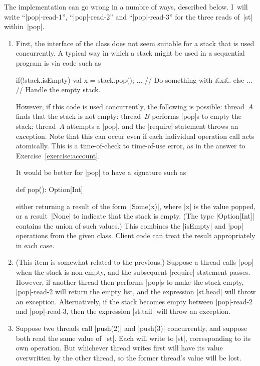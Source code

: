 \begin{answerS}
The implementation can go wrong in a numbre of ways, described below.  I~will
write ``|pop|-read-1'', ``|pop|-read-2'' and ``|pop|-read-3'' for the three
reads of~|st| within~|pop|.
%
\begin{enumerate}
\item First, the interface of the class does not seem suitable for a stack
  that is used concurrently.  A typical way in which a stack might be used in
  a sequential program is via code such as
\begin{scala}
  if(!stack.isEmpty){ 
    val x = stack.pop(); ... // Do something with £x£.
  }
  else ... // Handle the empty stack.
\end{scala}
However, if this code is used concurrently, the following is possible:
thread~$A$ finds that the stack is not empty; thread~$B$ performs |pop|s to
empty the stack; thread~$A$ attempts a |pop|, and the |require| statement
throws an exception.  Note that this can occur even if each individual
operation call acts atomically.  This is a time-of-check to time-of-use error,
as in the answer to Exercise~\ref{exercise:account}.

It would be better for |pop| to have a signature such as
\begin{scala}
  def pop(): Option[Int]
\end{scala}
either returning a result of the form~|Some(x)|, where |x| is the value
popped, or a result~|None| to indicate that the stack is empty.  (The type
|Option[Int]| contains the union of such values.)  This combines the |isEmpty|
and |pop| operations from the given class.  Client code can treat the result
appropriately in each case.  

\item (This item is somewhat related to the previous.)  Suppose a thread calls
  |pop| when the stack is non-empty, and the subsequent |require| statement
  passes.  However, if another thread then performs |pop|s to make the stack
  empty, |pop|-read-2 will return the empty list, and the expression |st.head|
  will throw an exception.  Alternatively, if the stack becomes empty between
  |pop|-read-2 and |pop|-read-3, then the expression |st.tail| will throw an
  exception.

\item Suppose two threads call |push(2)| and |push(3)| concurrently, and
  suppose both read the same value of~|st|.  Each will write to |st|,
  corresponding to its own operation.  But whichever thread writes first will
  have its value overwritten by the other thread, so the former thread's value
  will be lost.


\end{enumerate}
\end{answerS}
